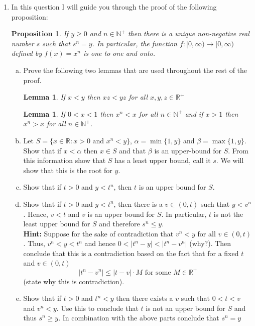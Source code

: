 \documentclass[12pt]{article}
\theoremstyle{plain}
\newtheorem{proposition}[theorem]{Proposition}
\newtheorem{lemma}[theorem]{Lemma}
\theoremstyle{definition}
\begin{document}
\begin{enumerate}[1.]
\item In this question I will guide you through the proof of the following proposition:
\begin{proposition}
 If $y\geq 0$ and $n\in \mathbb{N}^+$ then there is a unique non-negative real number $s$ such that $s^n=y$. In particular, the function $f:[0,\infty)\rightarrow [0,\infty)$ defined by $f(x)=x^n$ is one to one and onto. 
\end{proposition}
\begin{enumerate}[a)]
\item Prove the following two lemmas that are used throughout the rest of the proof.
\begin{lemma}
If $x<y$ then $xz<yz$ for all $x,y,z\in \mathbb{R}^+$
\end{lemma}
\begin{lemma}
If $0<x<1$ then $x^n<x$ for all $n\in \mathbb{N}^+$ and if $x>1$ then $x^n>x$ for all $n\in \mathbb{N}^+$.\\
\end{lemma}
\item Let $S=\{x\in \mathbb{R}: x>0 \text{ and }x^n<y\}$, $\alpha=\min\{1,y\}$ and $\beta=\max\{1,y\}$. Show that if $x<\alpha$ then $x\in S$ and that $\beta$ is an upper-bound for $S$. From this information show that $S$ has a least upper bound, call it $s$. We will show that this is the root for $y$.
\ \\
\item Show that if $t>0$ and $y<t^n$, then $t$ is an upper bound for $S$. 
\ \\
\item Show that if $t>0$ and $y<t^n$, then there is a $v\in (0,t)$ such that $y<v^n$. Hence, $v<t$ and $v$ is an upper bound for $S$. In particular, $t$ is not the least upper bound for $S$ and therefore $s^n\leq y$. \\
{\noindent\bf Hint:} Suppose for the sake of contradiction that $v^n<y$ for all $v\in (0,t)$. Thus, $v^n<y<t^n$ and hence $0<|t^n-y|<|t^n-v^n|$ (why?). Then conclude that this is a contradiction based on the fact that for a fixed $t$ and $v\in (0,t)$ 
\[|t^n-v^n|\leq |t-v|\cdot M \text{ for some }M\in\mathbb{R}^+\]
(state why this is contradiction). 
\ \\
\item Show that if $t>0$ and $t^n<y$ then there exists a $v$ such that $0<t<v$ and $v^n<y$. Use this to conclude that $t$ is not an upper bound for $S$ and thus $s^n\geq y$. In combination with the above parts conclude that $s^n=y$
\end{enumerate}
 \end{enumerate}
\end{document}
